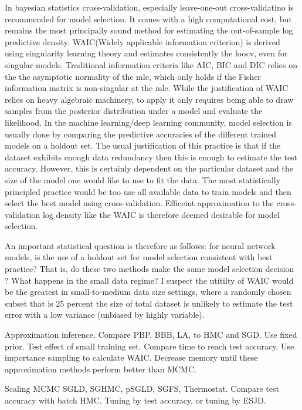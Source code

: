 \documentclass{book}
\begin{document}
\begin{enumerate}
In bayesian statistics \cite{gelman2014bayesian} cross-validation, especially leave-one-out cross-validatino is recommended for model selection. It comes with a high computational cost, but remains the most principally sound method for estimating the out-of-sample log predictive density. WAIC(Widely applicable information criterion) is derived using singularity learning theory and estimates consistently the loocv, even for singular models. Traditional information criteria like AIC, BIC and DIC relies on the the asymptotic normality of the mle, which only holds if the Fisher information matrix is non-singular at the mle. While the justification of WAIC relies on heavy algebraic machinery, to apply it only requires being able to draw samples from the posterior distribution under a model and evaluate the likelihood.  
In the machine learning/deep learning community, model selection is usually done
by comparing the predictive accuracies of the different trained models on a
holdout set. The usual justification of this practice is that if the dataset
exhibits enough data redundancy then  this is enough to estimate the test
accuracy. However, this is certainly dependent on the particular dataset and the
size of the model one would like to use to fit the data. The most statistically
principled practice would be too use all available data to train models and then
select the best model using cross-validation. Efficeint approximation to the
cross-validation log density like the WAIC is therefore deemed desirable for
model selection. 

An important statistical question is therefore as follows: for neural network models, is
the use of a holdout set for model selection consistent with best practice?
That is, do these two methods make the same model selection decision ? What happens
in the small data regime? I suspect the utitilty of WAIC would be the greatest
in small-to-medium data size settings, where a randomly chosen subset that is 25
percent the size of total dataset is unlikely to estimate the test error with a
low variance (unbiased by highly variable).

Approximation inference. 
Compare PBP, BBB, LA, to HMC and SGD. Use fixed prior. Test effect of small training
set. Compare time to reach test accuracy. Use importance sampling to calculate
WAIC. Decrease memory until these approximation methods perform better than
MCMC.

Scaling MCMC
SGLD, SGHMC, pSGLD, SGFS, Thermostat. Compare test accuracy with batch HMC.
Tuning by test accuracy, or tuning by ESJD.


\end{enumerate}
\end{document}
